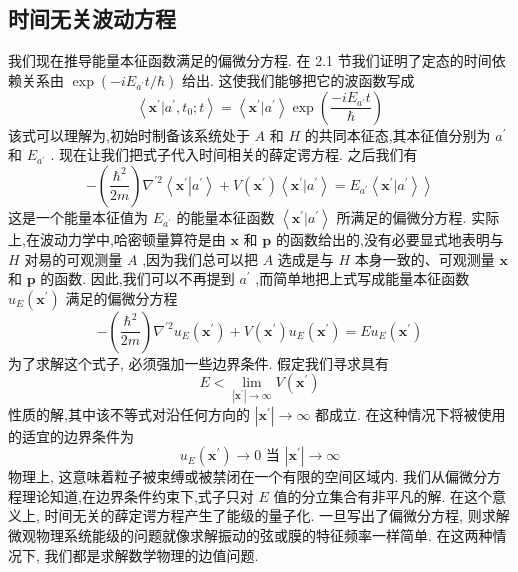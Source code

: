 \documentclass[lang=cn,newtx,10pt,scheme=chinese,thmcnt=section]{elegantbook}
\begin{document}
\subsection*{时间无关波动方程}
我们现在推导能量本征函数满足的偏微分方程. 在 2.1 节我们证明了定态的时间依赖关系由 $\exp \left( {-i{E}_{{a}^{\prime }}t/\hbar }\right)$ 给出. 这使我们能够把它的波函数写成
\begin{equation}
	\left\langle {{\mathbf{x}}^{\prime } | {a}^{\prime },{t}_{0};t}\right\rangle = \left\langle {{\mathbf{x}}^{\prime } | {a}^{\prime }}\right\rangle \exp \left( \frac{-i{E}_{{a}^{\prime }}t}{\hbar }\right)
\end{equation}
该式可以理解为,初始时制备该系统处于 $A$ 和 $H$ 的共同本征态,其本征值分别为 ${a}^{\prime }$ 和 ${E}_{{a}^{\prime }}$ . 现在让我们把式子代入时间相关的薛定谔方程. 之后我们有
\begin{equation}
	- \left( \frac{{\hbar }^{2}}{2m}\right) {\nabla }^{\prime 2}\left\langle {{\mathbf{x}}^{\prime }\left| {a}^{\prime }\right\rangle + V\left( {\mathbf{x}}^{\prime }\right) \left\langle {{\mathbf{x}}^{\prime } | {a}^{\prime }}\right\rangle = {E}_{{a}^{\prime }}\left\langle {{\mathbf{x}}^{\prime } | {a}^{\prime }}\right\rangle }\right\rangle
\end{equation}
这是一个能量本征值为 ${E}_{{a}^{\prime }}$ 的能量本征函数 $\left\langle {{\mathbf{x}}^{\prime } | {a}^{\prime }}\right\rangle$ 所满足的偏微分方程. 实际上,在波动力学中,哈密顿量算符是由 $\mathbf{x}$ 和 $\mathbf{p}$ 的函数给出的,没有必要显式地表明与 $H$ 对易的可观测量 $A$ ,因为我们总可以把 $A$ 选成是与 $H$ 本身一致的、可观测量 $\mathbf{x}$ 和 $\mathbf{p}$ 的函数. 因此,我们可以不再提到 ${a}^{\prime }$ ,而简单地把上式写成能量本征函数 ${u}_{E}\left( {\mathbf{x}}^{\prime }\right)$ 满足的偏微分方程
\begin{equation}
	- \left( \frac{{\hbar }^{2}}{2m}\right) {\nabla }^{\prime 2}{u}_{E}\left( {\mathbf{x}}^{\prime }\right) + V\left( {\mathbf{x}}^{\prime }\right) {u}_{E}\left( {\mathbf{x}}^{\prime }\right) = E{u}_{E}\left( {\mathbf{x}}^{\prime }\right)
\end{equation}
为了求解这个式子, 必须强加一些边界条件. 假定我们寻求具有
\begin{equation}
	E < \mathop{\lim }\limits_{{\left| {\mathbf{x}}^{\prime }\right| \rightarrow \infty }}V\left( {\mathbf{x}}^{\prime }\right)
\end{equation}
性质的解,其中该不等式对沿任何方向的 $\left| {\mathbf{x}}^{\prime }\right| \rightarrow \infty$ 都成立. 在这种情况下将被使用的适宜的边界条件为
\begin{equation}
	{u}_{E}\left( {\mathbf{x}}^{\prime }\right) \rightarrow 0\text{ 当 }\left| {\mathbf{x}}^{\prime }\right| \rightarrow \infty
\end{equation}
物理上, 这意味着粒子被束缚或被禁闭在一个有限的空间区域内. 我们从偏微分方程理论知道,在边界条件约束下,式子只对 $E$ 值的分立集合有非平凡的解. 在这个意义上, 时间无关的薛定谔方程产生了能级的量子化. 一旦写出了偏微分方程, 则求解微观物理系统能级的问题就像求解振动的弦或膜的特征频率一样简单. 在这两种情况下, 我们都是求解数学物理的边值问题.
\end{document}
